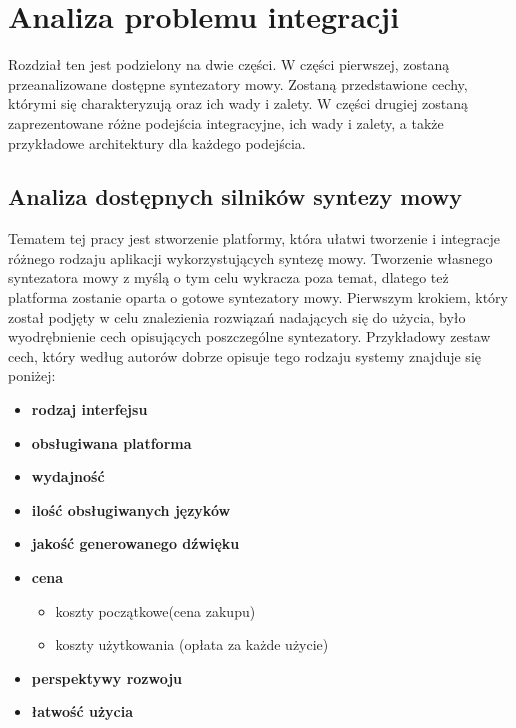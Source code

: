 
\chapter{Analiza problemu integracji} %



\ifpdf
    \graphicspath{{4/figures/PNG/}{4/figures/PDF/}{4/figures/}}
\else
    \graphicspath{{4/figures/EPS/}{4/figures/}}
\fi



Rozdział ten jest podzielony na dwie części. W części pierwszej, zostaną przeanalizowane dostępne syntezatory mowy. Zostaną przedstawione cechy, którymi się charakteryzują oraz ich wady i zalety. W części drugiej zostaną zaprezentowane różne podejścia integracyjne, ich wady i zalety, a także przykładowe architektury dla każdego podejścia. 

\section {Analiza dostępnych silników syntezy mowy}

Tematem tej pracy jest stworzenie platformy, która ułatwi tworzenie i integracje różnego rodzaju aplikacji wykorzystujących syntezę mowy. Tworzenie własnego syntezatora mowy z myślą o tym celu wykracza poza temat, dlatego też platforma zostanie oparta o gotowe syntezatory mowy. Pierwszym krokiem, który został podjęty w celu znalezienia rozwiązań nadających się do użycia, było wyodrębnienie cech opisujących poszczególne syntezatory. Przykładowy zestaw cech, który według autorów dobrze opisuje tego rodzaju systemy znajduje się poniżej: 

\begin{itemize}
	\item \textbf{rodzaj interfejsu}
	\item \textbf{obsługiwana platforma}
	\item \textbf{wydajność}
	\item \textbf{ilość obsługiwanych języków}
	\item \textbf{jakość generowanego dźwięku}
	\item \textbf{cena}
	\begin{itemize}
		\item koszty początkowe(cena zakupu)
		\item koszty użytkowania (opłata za każde użycie)
	\end{itemize}
	\item \textbf{perspektywy rozwoju}
	\item \textbf{łatwość użycia}
\end{itemize}


